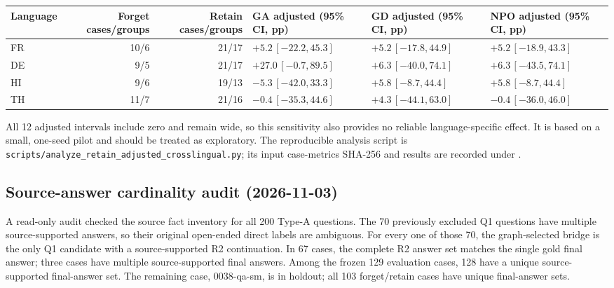 \documentclass[10pt,a4paper]{article}
\begin{document}
\begin{center}
\scriptsize
\begin{tabularx}{\textwidth}{@{}lrrXXX@{}}
\toprule
Language & Forget cases/groups & Retain cases/groups & GA adjusted (95\% CI, pp) & GD adjusted (95\% CI, pp) & NPO adjusted (95\% CI, pp) \\
\midrule
FR & 10/6 & 21/17 & $+5.2\,[-22.2,45.3]$ & $+5.2\,[-17.8,44.9]$ & $+5.2\,[-18.9,43.3]$ \\
DE & 9/5 & 21/17 & $+27.0\,[-0.7,89.5]$ & $+6.3\,[-40.0,74.1]$ & $+6.3\,[-43.5,74.1]$ \\
HI & 9/6 & 19/13 & $-5.3\,[-42.0,33.3]$ & $+5.8\,[-8.7,44.4]$ & $+5.8\,[-8.7,44.4]$ \\
TH & 11/7 & 21/16 & $-0.4\,[-35.3,44.6]$ & $+4.3\,[-44.1,63.0]$ & $-0.4\,[-36.0,46.0]$ \\
\bottomrule
\end{tabularx}
\end{center}

All 12 adjusted intervals include zero and remain wide, so this sensitivity also provides no reliable language-specific effect. It is based on a small, one-seed pilot and should be treated as exploratory. The reproducible analysis script is \texttt{scripts/analyze\_retain\_adjusted\_crosslingual.py}; its input case-metrics SHA-256 and results are recorded under .

\subsection*{Source-answer cardinality audit (2026-11-03)}

A read-only audit checked the source fact inventory for all 200 Type-A questions. The 70 previously excluded Q1 questions have multiple source-supported answers, so their original open-ended direct labels are ambiguous. For every one of those 70, the graph-selected bridge is the only Q1 candidate with a source-supported R2 continuation. In 67 cases, the complete R2 answer set matches the single gold final answer; three cases have multiple source-supported final answers. Among the frozen 129 evaluation cases, 128 have a unique source-supported final-answer set. The remaining case, 0038-qa-sm, is in holdout; all 103 forget/retain cases have unique final-answer sets.
\end{document}
